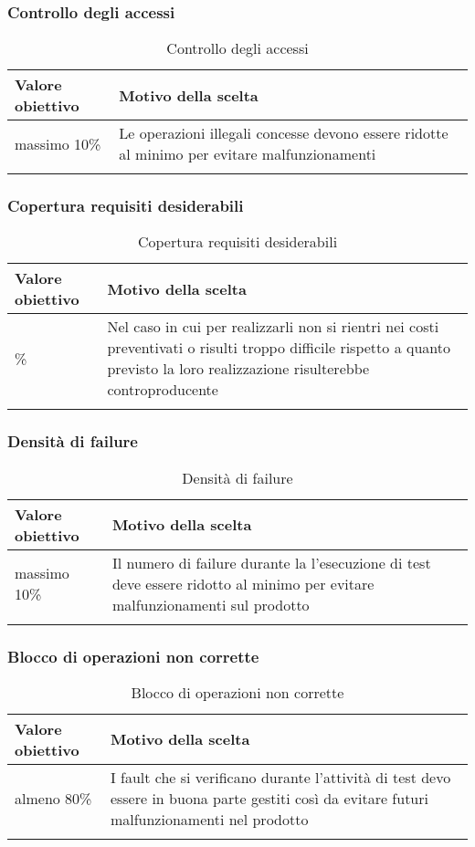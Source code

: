 \documentclass[../PianoDiQualifica_v4.0.0.tex]{subfiles}
\begin{document}
		\subsubsection{Controllo degli accessi}
			\begin{longtable}[c] { >{\centering\arraybackslash}p{4cm} p{7cm} }
				\toprule
				\centerline{\textbf{Valore obiettivo}} & \centerline{\textbf{Motivo della scelta}} \\
				\midrule
					massimo 10\% & Le operazioni illegali concesse devono essere ridotte al minimo per evitare malfunzionamenti \\
				\bottomrule
				\caption{Controllo degli accessi}
			\end{longtable}

		\subsubsection{Copertura requisiti desiderabili}
			\begin{longtable}[c] { >{\centering\arraybackslash}p{4cm} p{7cm} }
				\toprule
				\centerline{\textbf{Valore obiettivo}} & \centerline{\textbf{Motivo della scelta}} \\
				\midrule
					80\% &	Nel caso in cui per realizzarli non si rientri nei costi preventivati o risulti troppo difficile rispetto a quanto previsto la loro realizzazione risulterebbe controproducente \\
				\bottomrule
				\caption{Copertura requisiti desiderabili}
			\end{longtable}

		\subsubsection{Densità di failure}
			\begin{longtable}[c] { >{\centering\arraybackslash}p{4cm} p{7cm} }
				\toprule
				\centerline{\textbf{Valore obiettivo}} & \centerline{\textbf{Motivo della scelta}} \\
				\midrule
					massimo 10\% & Il numero di failure durante la l'esecuzione di test deve essere ridotto al minimo per evitare malfunzionamenti sul prodotto \\
				\bottomrule
				\caption{Densità di failure}
			\end{longtable}

		\subsubsection{Blocco di operazioni non corrette}
			\begin{longtable}[c] { >{\centering\arraybackslash}p{4cm} p{7cm} }
				\toprule
				\centerline{\textbf{Valore obiettivo}} & \centerline{\textbf{Motivo della scelta}} \\
				\midrule
					almeno 80\% & I fault che si verificano durante l'attività di test devo essere in buona parte gestiti così da evitare futuri malfunzionamenti nel prodotto \\
				\bottomrule
				\caption{Blocco di operazioni non corrette}
			\end{longtable}
\end{document}
